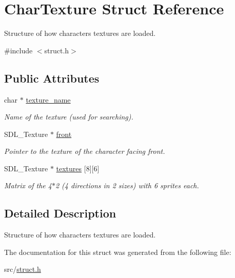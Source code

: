 \hypertarget{struct_char_texture}{}\section{Char\+Texture Struct Reference}
\label{struct_char_texture}


Structure of how characters textures are loaded.  




{\ttfamily \#include $<$struct.\+h$>$}

\subsection*{Public Attributes}
\begin{DoxyCompactItemize}
\item 
\mbox{\label{struct_char_texture_af0c8422a0a483b608d2b76d9abb04aec}} 
char $\ast$ \hyperlink{struct_char_texture_af0c8422a0a483b608d2b76d9abb04aec}{texture\+\_\+name}
\begin{DoxyCompactList}\small\item\em Name of the texture (used for searching). \end{DoxyCompactList}\item 
\mbox{\label{struct_char_texture_ac76f4d2a8033a031efbf8fcf684c7e19}} 
S\+D\+L\+\_\+\+Texture $\ast$ \hyperlink{struct_char_texture_ac76f4d2a8033a031efbf8fcf684c7e19}{front}
\begin{DoxyCompactList}\small\item\em Pointer to the texture of the character facing front. \end{DoxyCompactList}\item 
\mbox{\label{struct_char_texture_a1acc7c6b86e69a941fe473355a774452}} 
S\+D\+L\+\_\+\+Texture $\ast$ \hyperlink{struct_char_texture_a1acc7c6b86e69a941fe473355a774452}{textures} \mbox{[}8\mbox{]}\mbox{[}6\mbox{]}
\begin{DoxyCompactList}\small\item\em Matrix of the 4$\ast$2 (4 directions in 2 sizes) with 6 sprites each. \end{DoxyCompactList}\end{DoxyCompactItemize}


\subsection{Detailed Description}
Structure of how characters textures are loaded. 

The documentation for this struct was generated from the following file\+:\begin{DoxyCompactItemize}
\item 
src/\hyperlink{struct_8h}{struct.\+h}\end{DoxyCompactItemize}
